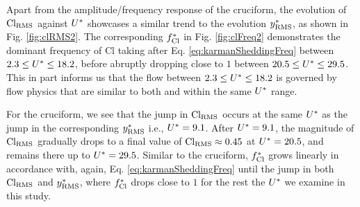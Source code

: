 \documentclass[oneside]{utmthesis}
\begin{document}
Apart from the amplitude/frequency response of the \angtw{} cruciform, the evolution of $\text{Cl}_{\text{RMS}}$ against $U^{*}$ showcases a similar trend to the evolution $y^{*}_{\text{RMS}}$, as shown in Fig. \ref{fig:clRMS2}. The corresponding $f_{\text{Cl}}^{*}$ in Fig. \ref{fig:clFreq2} demonstrates the dominant frequency of Cl taking after Eq. \ref{eq:karmanSheddingFreq} between $2.3 \leq U^{*} \leq 18.2$, before abruptly dropping close to $1$ between $20.5 \leq U^{*} \leq 29.5$. This in part informs us that the flow between $2.3 \leq U^{*} \leq 18.2$ is governed by flow physics that are similar to both \angfo{} and \angth{} within the same $U^{*}$ range.

For the \angon{} cruciform, we see that the jump in $\text{Cl}_{\text{RMS}}$ occurs at the same $U^{*}$ as the jump in the corresponding $y^{*}_{\text{RMS}}$ i.e., $U^{*} = 9.1$. After $U^{*} = 9.1$, the magnitude of $\text{Cl}_{\text{RMS}}$ gradually drops to a final value of $\text{Cl}_{\text{RMS}} \approx 0.45$ at $U^{*} = 20.5$, and remains there up to $U^{*} = 29.5$. Similar to the \angtw{} cruciform, $f_{\text{Cl}}^{*}$ grows linearly in accordance with, again, Eq. \ref{eq:karmanSheddingFreq} until the jump in both $\text{Cl}_{\text{RMS}}$ and $y^{*}_{\text{RMS}}$, where $f_{\text{Cl}}^{*}$ drops close to $1$ for the rest the $U^{*}$ we examine in this study.
\end{document}
